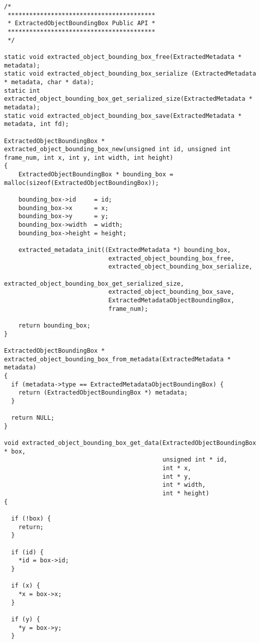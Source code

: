 \begin{lstlisting}
/*
 *****************************************
 * ExtractedObjectBoundingBox Public API *
 *****************************************
 */

static void extracted_object_bounding_box_free(ExtractedMetadata * metadata);
static void extracted_object_bounding_box_serialize (ExtractedMetadata * metadata, char * data);
static int extracted_object_bounding_box_get_serialized_size(ExtractedMetadata * metadata);
static void extracted_object_bounding_box_save(ExtractedMetadata * metadata, int fd);

ExtractedObjectBoundingBox * extracted_object_bounding_box_new(unsigned int id, unsigned int frame_num, int x, int y, int width, int height)
{
    ExtractedObjectBoundingBox * bounding_box = malloc(sizeof(ExtractedObjectBoundingBox));

    bounding_box->id     = id;
    bounding_box->x      = x;
    bounding_box->y      = y;
    bounding_box->width  = width;
    bounding_box->height = height;

    extracted_metadata_init((ExtractedMetadata *) bounding_box,
                             extracted_object_bounding_box_free,
                             extracted_object_bounding_box_serialize,
                             extracted_object_bounding_box_get_serialized_size,
                             extracted_object_bounding_box_save,
                             ExtractedMetadataObjectBoundingBox,
                             frame_num);

    return bounding_box;
}

ExtractedObjectBoundingBox * extracted_object_bounding_box_from_metadata(ExtractedMetadata * metadata)
{
  if (metadata->type == ExtractedMetadataObjectBoundingBox) {
    return (ExtractedObjectBoundingBox *) metadata;
  }

  return NULL;
}

void extracted_object_bounding_box_get_data(ExtractedObjectBoundingBox * box,
                                            unsigned int * id,
                                            int * x,
                                            int * y,
                                            int * width,
                                            int * height)
{

  if (!box) {
    return;
  }

  if (id) {
    *id = box->id;
  }

  if (x) {
    *x = box->x;
  }

  if (y) {
    *y = box->y;
  }


\end{lstlisting}
